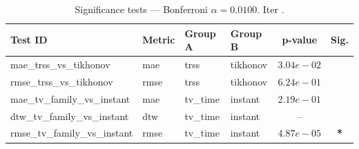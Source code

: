 ﻿%
\begin{table}[ht]
\centering
\caption[EEG reconstruction - Iteration it16b]{Significance tests — Bonferroni $\alpha=0.0100$. Iter .}
\label{tab:sig_it16b_vknng_3syn}
\small
\begin{tabular}{llllcc}
\toprule
Test ID & Metric & Group A & Group B & p-value & Sig. \\
\midrule
mae\_trss\_vs\_tikhonov & mae & trss & tikhonov & $3.04e-02$ &  \\
rmse\_trss\_vs\_tikhonov & rmse & trss & tikhonov & $6.24e-01$ &  \\
mae\_tv\_family\_vs\_instant & mae & tv\_time & instant & $2.19e-01$ &  \\
dtw\_tv\_family\_vs\_instant & dtw & tv\_time & instant & -- &  \\
rmse\_tv\_family\_vs\_instant & rmse & tv\_time & instant & $4.87e-05$ & \textbf{*} \\
\bottomrule
\end{tabular}
\end{table}







